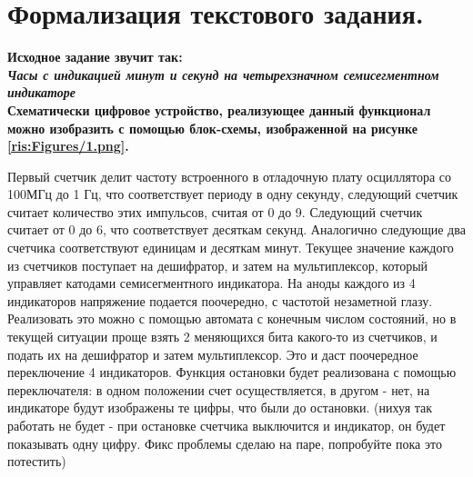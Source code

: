 \begin{sloppypar} %
\newpage %

\section{Формализация текстового задания.} %
\textbf{
Исходное задание звучит так:\\ \textit{Часы с индикацией минут и секунд на четырехзначном семисегментном индикаторе}\\
Схематически цифровое устройство, реализующее данный функционал можно изобразить с помощью блок-схемы, изображенной на рисунке \ref{ris:Figures/1.png}.}

Первый счетчик делит частоту встроенного в отладочную плату осциллятора со 100МГц до 1 Гц, что соответствует периоду в одну секунду, следующий счетчик считает количество этих импульсов, считая от 0 до 9. Следующий счетчик считает от 0 до 6, что соответствует десяткам секунд. Аналогично следующие два счетчика соответствуют единицам и десяткам минут. Текущее значение каждого из счетчиков поступает на дешифратор, и затем на мультиплексор, который управляет катодами семисегментного индикатора. На аноды каждого из 4 индикаторов напряжение подается поочередно, с частотой незаметной глазу. Реализовать это можно с помощью автомата с конечным числом состояний, но в текущей ситуации проще взять 2 меняющихся бита какого-то из счетчиков, и подать их на дешифратор и затем мультиплексор. Это и даст поочередное переключение 4 индикаторов. Функция остановки будет реализована с помощью переключателя: в одном положении счет осуществляется, в другом - нет, на индикаторе будут изображены те цифры, что были до остановки. (нихуя так работать не будет - при остановке счетчика выключится и индикатор, он будет показывать одну цифру. Фикс проблемы сделаю на паре, попробуйте пока это потестить)


\end{sloppypar}
